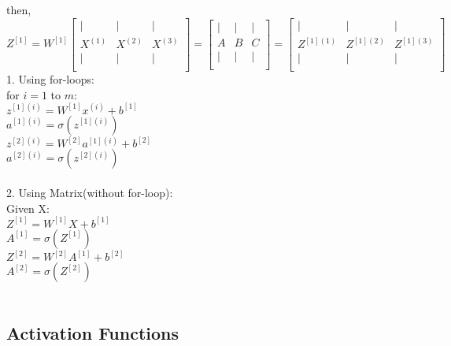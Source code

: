 \documentclass{article}
\begin{document}
then, $Z^{[1]} = W^{[1]}\begin{bmatrix}
    | &| & | \\
    X^{(1)} & X^{(2)} & X^{(3)} \\
    | &| & | \\
\end{bmatrix}
=\begin{bmatrix}
    | & | & | \\
    A & B & C \\
    | & | & | \\
\end{bmatrix}
=\begin{bmatrix}
    | &| & | \\
    Z^{[1](1)} & Z^{[1](2)} & Z^{[1](3)} \\
    | &| & | \\
\end{bmatrix}
$\\

1. Using for-loops:\\

for $i=1$  to $m$:\\

$z^{[1](i)} = W^{[1]} x^{(i)} + b^{[1]}$\\

$a^{[1](i)} = \sigma(z^{[1](i)})$\\

$z^{[2](i)} = W^{[2]}a^{[1](i)} + b^{[2]}$\\

$a^{[2](i)} = \sigma(z^{[2](i)})$\\\\

2. Using Matrix(without for-loop): \\

Given X:\\

$Z^{[1]} = W^{[1]} X + b^{[1]}$\\

$A^{[1]} = \sigma(Z^{[1]})$\\

$Z^{[2]} = W^{[2]}A^{[1]} + b^{[2]}$\\

$A^{[2]} = \sigma(Z^{[2]})$\\\\



\newpage
\subsection{Activation Functions}
\end{document}
